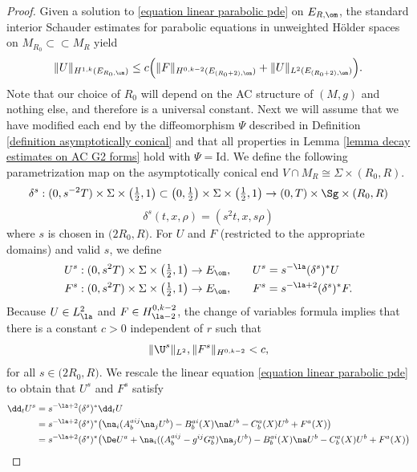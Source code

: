 \documentclass[hidelinks, 12pt, oneside, reqno]{amsart}
\begin{document}
\begin{proof}
    Given a solution to \eqref{equation linear parabolic pde} on $E_{R,\om}$, the standard interior Schauder estimates for parabolic equations in unweighted H\"older spaces on $M_{R_0} \subset \subset M_R$ yield
    \begin{equation}\label{equation base schauder estimates}
    \|U\|_{H^{1,k}(E_{R_0,\om})} \le c\Big(\|F\|_{H^{0,k-2}(E_{(R_0+2),\om})} + \|U\|_{L^2(E_{(R_0+2),\om})} \Big).
    \end{equation}
    Note that our choice of $R_0$ will depend on the AC structure of $(M,g)$ and nothing else, and therefore is a universal constant. Next we will assume that we have modified each end by the diffeomorphism $\Psi$ described in Definition \ref{definition asymptotically conical} and that all properties in Lemma \ref{lemma decay estimates on AC G2 forms} hold with $\Psi = \mathrm{Id}$. We define the following parametrization map on the asymptotically conical end $V \cap M_R \cong \Sigma \times (R_0, R)$.
    \[
    \delta^s : (0,s^{-2}T) \times \Sigma \times \big(\tfrac12, 1\big) \subset \big(0,\tfrac12\big) \times \Sigma \times \big(\tfrac12, 1\big) \rightarrow (0,T) \times \Sg \times (R_0,R)
    \]
    \[
    \delta^s(t,x,\rho) = (s^2t, x, s\rho)
    \]
    where $s$ is chosen in $\big(2R_0,R \big)$. For $U$ and $F$ (restricted to the appropriate domains) and valid $s$, we define
    \begin{align*}
        U^s : (0,s^2T) \times \Sigma \times \big( \tfrac12, 1 \big) \rightarrow E_\om, &\qquad U^s = s^{-\la}(\delta^s)^*U \\
        F^s : (0,s^2T) \times \Sigma \times \big( \tfrac12, 1 \big) \rightarrow E_\om, &\qquad F^s = s^{-\la + 2}(\delta^s)^*F. 
    \end{align*}
    Because $U \in L^2_{\la}$ and $F \in H^{0,k-2}_{\la-2}$, the change of variables formula implies that there is a constant $c > 0$ independent of $r$ such that 
    \[
    \|\U^s\|_{L^2}, \|F^s\|_{H^{0,k-2}} < c,
    \]
    for all $s \in \big(2R_0, R \big)$. We rescale the linear equation \eqref{equation linear parabolic pde} to obtain that $U^s$ and $F^s$ satisfy
    \begin{align*}
    \dd_t U^s &= s^{-\la + 2}(\delta^s)^*\dd_t U \\ 
    &= s^{-\la + 2}(\delta^s)^*\big(\na_i(A^{aij}_b\na_j U^b) - B^{ai}_b(X) \na U^b - C^a_b(X) U^b + F^a(X)\big) \\
    &= s^{-\la + 2}(\delta^s)^*\big(\De U^a + \na_i((A^{aij}_b - g^{ij}G^a_b)\na_j U^b) - B^{ai}_b(X) \na U^b - C^a_b(X) U^b + F^a(X)\big) \\

\end{align*}
\end{proof}
\end{document}

